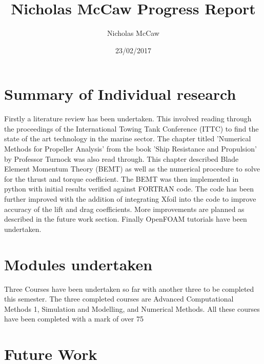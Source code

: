\documentclass[12pt]{article}
\title{Nicholas McCaw Progress Report}
\author{Nicholas McCaw}
\date{23/02/2017}
\begin{document}
\maketitle

\section{Summary of Individual research }
Firstly a literature review has been undertaken. This involved reading through the proceedings of the International Towing Tank Conference (ITTC) to find the state of the art technology in the marine sector.  The chapter titled 'Numerical Methods for Propeller Analysis' from the book 'Ship Resistance and Propulsion' by Professor Turnock was also read through. This chapter described Blade Element Momentum Theory (BEMT) as well as the numerical procedure to solve for the thrust and torque coefficient. The BEMT was then implemented in python with initial results verified against FORTRAN code. The code has been further improved with the addition of integrating Xfoil into the code to improve accuracy of the lift and drag coefficients. More improvements are planned as described in the future work section. Finally OpenFOAM tutorials have been undertaken.
\\

\section{Modules undertaken}

Three Courses have been undertaken so far with another three to be completed this semester. The three completed courses are Advanced Computational Methods 1, Simulation and Modelling, and Numerical Methods. All these courses have been completed with a mark of over 75%

\section{Future Work}
\end{document}
